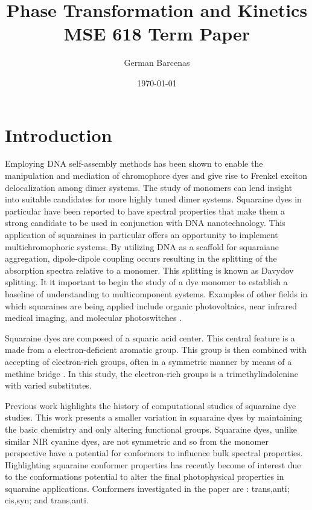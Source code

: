 \documentclass[journal=jacsat,manuscript=article]{achemso}
\title{
Phase Transformation and Kinetics\\
\large
MSE 618
\large
Term Paper
}
\author{German Barcenas}
\affiliation{Boise State University}
\date{\today}
\begin{document}
\maketitle

\section{Introduction}
Employing DNA self-assembly methods has been shown to enable the manipulation and mediation of chromophore dyes and give rise to Frenkel exciton delocalization among dimer systems\cite{Cannon2018LargeAggregates}.  The study of monomers can lend insight into suitable candidates for more highly tuned dimer systems. Squaraine dyes in particular have been reported to have spectral properties that make them a strong candidate to be used in conjunction with DNA nanotechnology\cite{Markova2013ComparisonLabels}⁠. This application of squaraines in particular offers an opportunity to implement multichromophoric systems. By utilizing DNA as a scaffold for squaraiane aggregation, dipole-dipole coupling occurs resulting in the splitting of the absorption spectra relative to a monomer. This splitting  is known as Davydov splitting\cite{Zhong2019DavydovDimers}. It it important to begin the study of a dye monomer to establish a baseline of understanding to multicomponent systems.  Examples of other fields in which squaraines are being applied include organic photovoltaics\citep{Wei2012FunctionalizedPhotovoltaics, Chen2018DensityCell}, near infrared medical imaging\cite{Strassel2018SquaraineNm}⁠, and molecular photoswitches\citep{Kellis2019AnPhases, Scholes2011LessonsHarvesting} .

Squaraine dyes are composed of a squaric acid center. This central feature is a made from a electron-deficient  aromatic group. This group is then combined with accepting of electron-rich groups, often in a symmetric manner by means of a methine bridge \cite{Ilina2020SquaraineChallenges}⁠. In this study, the electron-rich groups is a trimethylindolenine with varied substitutes.

Previous work\cite{Bassal2017ExploringADC2}⁠ highlights the history of computational studies of squaraine dye studies. This work presents a smaller variation in squaraine dyes by maintaining the basic chemistry and only altering functional groups. Squaraine dyes, unlike similar NIR cyanine dyes, are not symmetric and so from the monomer perspective have a potential for conformers to influence bulk spectral properties\cite{Kolosova2018MolecularSquaraines}⁠. Highlighting squaraine conformer properties has recently become of interest due to the conformations potential to alter the final photophysical properties in squaraine applications\cite{Paterno2018ExcitedScenario}⁠.  Conformers investigated in the paper are : trans,anti; cis,syn; and trans,anti.
\end{document}
